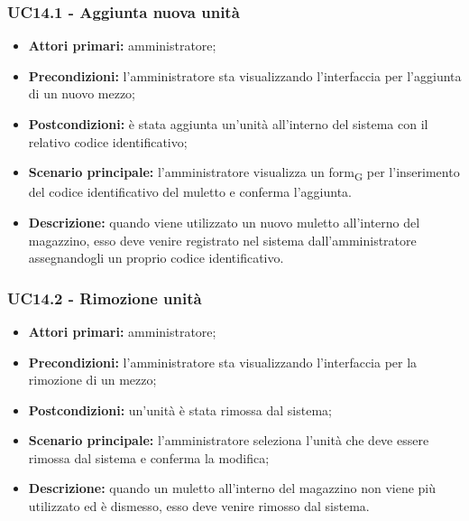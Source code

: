 \subsubsection{UC14.1 - Aggiunta nuova unità}
\begin{itemize}
	\item 	\textbf{Attori primari:} amministratore;
	\item 	\textbf{Precondizioni:} l'amministratore sta visualizzando l'interfaccia per l'aggiunta di un nuovo mezzo;
	\item 	\textbf{Postcondizioni:} è stata aggiunta un'unità all'interno del sistema con il relativo codice identificativo;
	\item 	\textbf{Scenario principale:} l'amministratore visualizza un \gls{form}\textsubscript{G} per l'inserimento del codice identificativo del muletto e conferma l'aggiunta.
	\item 	\textbf{Descrizione:} quando viene utilizzato un nuovo muletto all'interno del magazzino, esso deve venire registrato nel sistema dall'amministratore assegnandogli un proprio codice identificativo.

\end{itemize}


\subsubsection{UC14.2 - Rimozione unità}
\begin{itemize}
	\item 	\textbf{Attori primari:} amministratore;
	\item 	\textbf{Precondizioni:} l'amministratore sta visualizzando l'interfaccia per la rimozione di un mezzo;
	\item 	\textbf{Postcondizioni:} un'unità è stata rimossa dal sistema;
	\item 	\textbf{Scenario principale:} l'amministratore seleziona l'unità che deve essere rimossa dal sistema e conferma la modifica;
	\item 	\textbf{Descrizione:} quando un muletto all'interno del magazzino non viene più utilizzato ed è dismesso, esso deve venire rimosso dal sistema.
	
\end{itemize}
